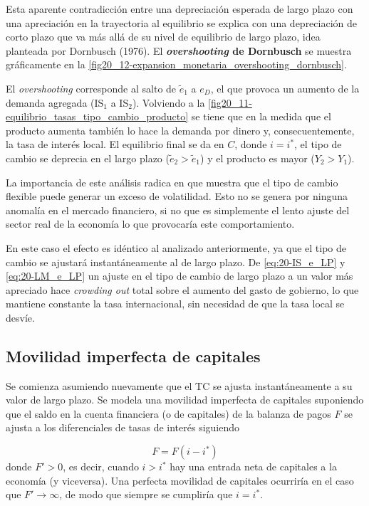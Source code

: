 \documentclass[DeGregorioResumen]{subfiles}
\begin{document}
Esta aparente contradicción entre una depreciación esperada de largo plazo con una apreciación en la trayectoria al equilibrio se explica con una depreciación de corto plazo que va más allá de su nivel de equilibrio de largo plazo, idea planteada por Dornbusch (1976). El \textbf{\textit{overshooting} de Dornbusch} se muestra gráficamente en la \autoref{fig20_12-expansion_monetaria_overshooting_dornbusch}.



El \textit{overshooting} corresponde al salto de $\tilde e_1$ a $e_D$, el que provoca un aumento de la demanda agregada (IS$_1$ a IS$_2$). Volviendo a la \autoref{fig20_11-equilibrio_tasas_tipo_cambio_producto} se tiene que en la medida que el producto aumenta también lo hace la demanda por dinero y, consecuentemente, la tasa de interés local. El equilibrio final se da en $C$, donde $i=i^*$, el tipo de cambio se deprecia en el largo plazo ($\tilde e_2>\tilde e_1$) y el producto es mayor ($Y_2>Y_1$).

La importancia de este análisis radica en que muestra que el tipo de cambio flexible puede generar un exceso de volatilidad. Esto no se genera por ninguna anomalía en el mercado financiero, si no que es simplemente el lento ajuste del sector real de la economía lo que provocaría este comportamiento.


En este caso el efecto es idéntico al analizado anteriormente, ya que el tipo de cambio se ajustará instantáneamente al de largo plazo. De \eqref{eq:20-IS_e_LP} y \eqref{eq:20-LM_e_LP} un ajuste en el tipo de cambio de largo plazo a un valor más apreciado hace \textit{crowding out} total sobre el aumento del gasto de gobierno, lo que mantiene constante la tasa  internacional, sin necesidad de que la tasa local se desvíe.

\subsection{Movilidad imperfecta de capitales}

Se comienza asumiendo nuevamente que el TC se ajusta instantáneamente a su valor de largo plazo. Se modela una movilidad imperfecta de capitales suponiendo que el saldo en la cuenta financiera (o de capitales) de la balanza de pagos $F$ se ajusta a los diferenciales de tasas de interés siguiendo

\begin{equation*}
	F = F(i-i^*)
\end{equation*}
donde $F'>0$, es decir, cuando $i>i^*$ hay una entrada neta de capitales a la economía (y viceversa). Una perfecta movilidad de capitales ocurriría en el caso que $F' \rightarrow \infty$, de modo que siempre se cumpliría que $i=i^*$.
\end{document}
